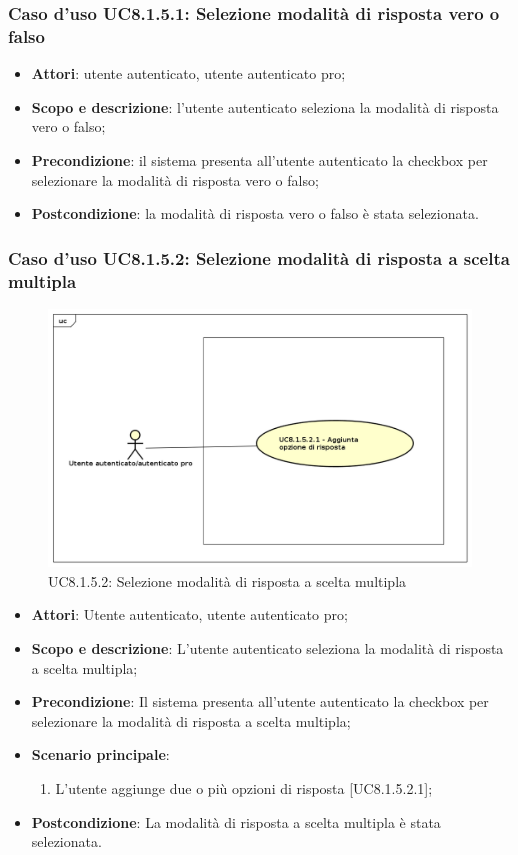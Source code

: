 	\subsubsection{Caso d'uso UC8.1.5.1: Selezione modalità di risposta vero o falso}
	\begin{itemize}
		\item
			\textbf{Attori}: utente autenticato, utente autenticato pro;
		\item
			\textbf{Scopo e descrizione}: l'utente autenticato seleziona la modalità di risposta vero o falso;
		\item		
			\textbf{Precondizione}: il sistema presenta all'utente autenticato la checkbox per selezionare la modalità di risposta vero o falso;
		\item
			\textbf{Postcondizione}: la modalità di risposta vero o falso è stata selezionata.
	\end{itemize}
	\subsubsection{Caso d'uso UC8.1.5.2: Selezione modalità di risposta a scelta multipla}
	\label{UC8.1.5.2}
	\begin{figure}[h]
		\centering
			\includegraphics[scale=0.5,keepaspectratio]{UML/UC8_1_5_2.png}
		\caption{UC8.1.5.2: Selezione modalità di risposta a scelta multipla}
	\end{figure}
	\FloatBarrier	
	\begin{itemize}
		\item
			\textbf{Attori}: Utente autenticato, utente autenticato pro;
		\item
			\textbf{Scopo e descrizione}: L'utente autenticato seleziona la modalità di risposta a scelta multipla;
		\item		
			\textbf{Precondizione}: Il sistema presenta all'utente autenticato la checkbox per selezionare la modalità di risposta a scelta multipla;
		\item
			\textbf{Scenario principale}:
				\begin{enumerate}
					\item 	
						L'utente aggiunge due o più opzioni di risposta [UC8.1.5.2.1];	
				\end{enumerate}
		\item
			\textbf{Postcondizione}: La modalità di risposta a scelta multipla è stata selezionata.
	\end{itemize}
